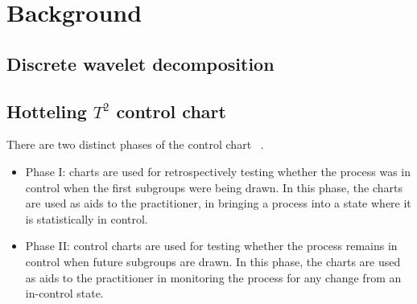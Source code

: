 \chapter{Background}
\label{cp:Background}

\begin{comment}
Please write down the basic background for your research, e.g., the fundamental concepts of the approaches that you use in the thesis, so that other people (who do not have the background) can understand your work.

Here is one example for sigmoid function:

The sigmoid function is defined by formula~\ref{eq:sigmoid}. It can compress the input into the interval $(0, 1)$. The drawback of the sigmoid activation function is the so-called ``kill gradients'': if the input values locate in the tail of 0 or 1, the gradient at these regions tend to be zero. If the sigmoid function is used multiple times in a neural network, the gradients may be very small or even disappear.

\begin{equation}
\label{eq:sigmoid}
\centering{f(x) = \frac{1}{1 + e^{-x}}}.
\end{equation}
\end{comment}

\section{Discrete wavelet decomposition}


\section{Hotteling $T^{2}$ control chart}

There are two distinct phases of the control chart
~\cite{bersimis2007multivariate}.

\begin{itemize}
\item Phase I: charts are used for retrospectively testing whether the process was in control when the first
subgroups were being drawn. In this phase, the charts are used as aids to the practitioner, in bringing a
process into a state where it is statistically in control.
\item Phase II: control charts are used for testing whether the process remains in control when future subgroups
are drawn. In this phase, the charts are used as aids to the practitioner in monitoring the process for any
change from an in-control state.
\end{itemize}





